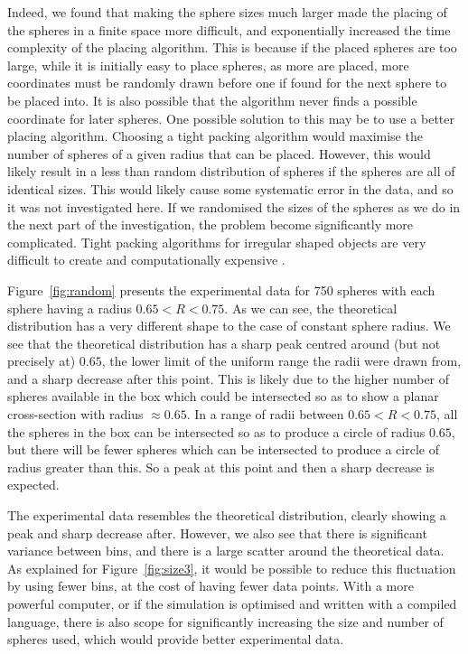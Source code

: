 \documentclass[journal]{IEEEtran}
\begin{document}
Indeed, we found that making the sphere sizes much larger made the placing of
the spheres in a finite space more difficult, and exponentially increased the
time complexity of the placing algorithm. This is because if the placed spheres
are too large, while it is initially easy to place spheres, as more are placed,
more coordinates must be randomly drawn before one if found for the next sphere
to be placed into. It is also possible that the algorithm never finds a possible
coordinate for later spheres. One possible solution to this may be to use a
better placing algorithm. Choosing a tight packing algorithm \cite{Chen2001} would
maximise the number of spheres of a given radius that can be placed. However,
this would likely result in a less than random distribution of spheres if the
spheres are all of identical sizes. This would likely cause some systematic
error in the data, and so it was not investigated here. If we randomised the
sizes of the spheres as we do in the next part of the investigation, the problem
become significantly more complicated. Tight packing algorithms for irregular
shaped objects are very difficult to create and computationally expensive
\cite{Ma2018}. 

Figure~\ref{fig:random} presents the experimental data for 750 spheres with each
sphere having a radius $0.65 < R < 0.75$. As we can see, the theoretical
distribution has a very different shape to the case of constant sphere
radius. We see that the theoretical distribution has a sharp peak centred around
(but not precisely at) $0.65$, the lower limit of the uniform range the radii
were drawn from, and a sharp decrease after this point. This is likely due to
the higher number of spheres available in the box which could be intersected so
as to show a planar cross-section with radius $\approx 0.65$. In a range of
radii between $0.65 < R < 0.75$, all the spheres in the box can be intersected
so as to produce a circle of radius $0.65$, but there will be fewer spheres
which can be intersected to produce a circle of radius greater than this. So a
peak at this point and then a sharp decrease is expected.

The experimental data resembles the theoretical distribution, clearly showing a
peak and sharp decrease after. However, we also see that there is significant
variance between bins, and there is a large scatter around the theoretical
data. As explained for Figure~\ref{fig:size3}, it would be possible to reduce
this fluctuation by using fewer bins, at the cost of having fewer data
points. With a more powerful computer, or if the simulation is optimised and
written with a compiled language, there is also scope for significantly
increasing the size and number of spheres used, which would provide better
experimental data.
\end{document}
